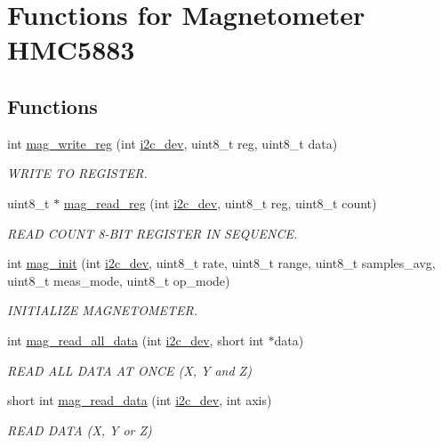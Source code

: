 \hypertarget{group__mag}{\section{Functions for Magnetometer H\-M\-C5883}
\label{group__mag}
}
\subsection*{Functions}
\begin{DoxyCompactItemize}
\item 
int \hyperlink{group__mag_gab5d0ae421cd4bb10b1b7a1eda167416b}{mag\-\_\-write\-\_\-reg} (int \hyperlink{CommunicationV0_2communication_8c_a7751bd45ac1064efb35adf1f19c25db8}{i2c\-\_\-dev}, uint8\-\_\-t reg, uint8\-\_\-t data)
\begin{DoxyCompactList}\small\item\em W\-R\-I\-T\-E T\-O R\-E\-G\-I\-S\-T\-E\-R. \end{DoxyCompactList}\item 
uint8\-\_\-t $\ast$ \hyperlink{group__mag_ga6830eaeae2298320e1e8c902e4edd709}{mag\-\_\-read\-\_\-reg} (int \hyperlink{CommunicationV0_2communication_8c_a7751bd45ac1064efb35adf1f19c25db8}{i2c\-\_\-dev}, uint8\-\_\-t reg, uint8\-\_\-t count)
\begin{DoxyCompactList}\small\item\em R\-E\-A\-D C\-O\-U\-N\-T 8-\/\-B\-I\-T R\-E\-G\-I\-S\-T\-E\-R I\-N S\-E\-Q\-U\-E\-N\-C\-E. \end{DoxyCompactList}\item 
int \hyperlink{group__mag_ga014f908c9faa37c1ec75177a17012a01}{mag\-\_\-init} (int \hyperlink{CommunicationV0_2communication_8c_a7751bd45ac1064efb35adf1f19c25db8}{i2c\-\_\-dev}, uint8\-\_\-t rate, uint8\-\_\-t range, uint8\-\_\-t samples\-\_\-avg, uint8\-\_\-t meas\-\_\-mode, uint8\-\_\-t op\-\_\-mode)
\begin{DoxyCompactList}\small\item\em I\-N\-I\-T\-I\-A\-L\-I\-Z\-E M\-A\-G\-N\-E\-T\-O\-M\-E\-T\-E\-R. \end{DoxyCompactList}\item 
int \hyperlink{group__mag_gab42ae0d0a2a6f37cf36d856c072b7f34}{mag\-\_\-read\-\_\-all\-\_\-data} (int \hyperlink{CommunicationV0_2communication_8c_a7751bd45ac1064efb35adf1f19c25db8}{i2c\-\_\-dev}, short int $\ast$data)
\begin{DoxyCompactList}\small\item\em R\-E\-A\-D A\-L\-L D\-A\-T\-A A\-T O\-N\-C\-E (X, Y and Z) \end{DoxyCompactList}\item 
short int \hyperlink{group__mag_ga542a31ccd07cd2c3e8e2b68cdb6d219e}{mag\-\_\-read\-\_\-data} (int \hyperlink{CommunicationV0_2communication_8c_a7751bd45ac1064efb35adf1f19c25db8}{i2c\-\_\-dev}, int axis)
\begin{DoxyCompactList}\small\item\em R\-E\-A\-D D\-A\-T\-A (X, Y or Z) \end{DoxyCompactList}\end{DoxyCompactItemize}


